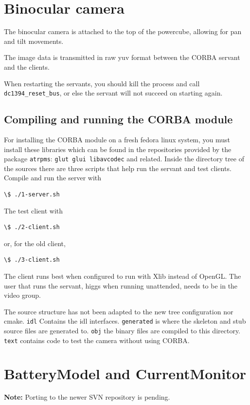 
\section{Binocular camera}
\label{sec:devmanual_camera}
The binocular camera is attached to the top of the powercube, allowing for pan
and tilt movements.

The image data is transmitted in raw yuv format between the CORBA servant and the clients.

When restarting the servants, you should kill the process and call \\
\texttt{dc1394\_reset\_bus}, or else the servant will not succeed on starting
again.

\subsection{Compiling and running the CORBA module}
For installing the CORBA module on a fresh fedora linux system, you
must install these libraries which can be found in the repositories
provided by the package \texttt{atrpms}: \texttt{glut glui libavcodec} and
related. Inside the directory tree of the sources there are three scripts that help run the servant and test clients.
Compile and run the server with
\begin{verbatim}
\$ ./1-server.sh
\end{verbatim}
The test client with
\begin{verbatim}
\$ ./2-client.sh
\end{verbatim}
or, for the old client,
\begin{verbatim}
\$ ./3-client.sh
\end{verbatim}
The client runs best when configured to run with Xlib instead of OpenGL.
The user that runs the servant, higgs when running unattended, needs to be in the video group.

The source structure has not been adapted to the new tree configuration nor cmake.
\verb|idl| Contains the idl interfaces. \verb|generated| is where the skeleton and stub source files are generated to. \verb|obj| the binary files are compiled to this directory. \verb|text| contains code to test the camera without using CORBA.



\section{BatteryModel and CurrentMonitor}
\textbf{Note:} Porting to the newer SVN repository is pending.

